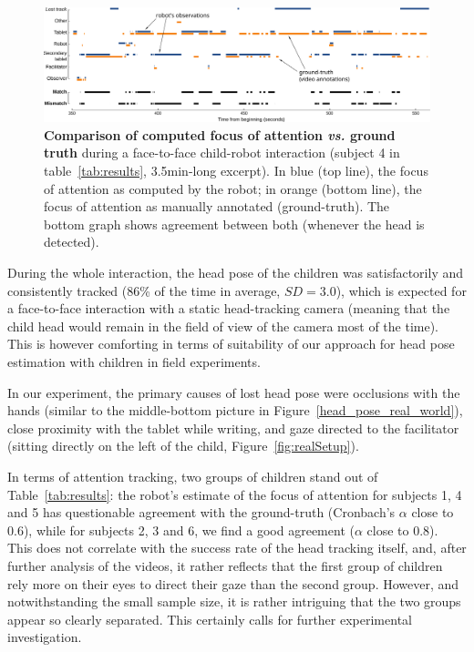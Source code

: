 \documentclass{sig-alternate}
\newcommand{\vs}{\textit{vs.}\xspace}
\begin{document}
\begin{figure}
    \centering
    \includegraphics[width=\linewidth]{matches-excerpt}
    \caption{\small \textbf{Comparison of computed focus of attention \vs ground
        truth} during a face-to-face child-robot interaction (subject 4
        in table~\ref{tab:results}, 3.5min-long excerpt).
        In blue (top line), the focus of attention as computed by the robot;
        in orange (bottom line), the focus of attention as manually annotated
        (ground-truth). The bottom graph shows agreement between both (whenever
        the head is detected).}

    \label{fig:realExpected}
    
\end{figure}


During the whole interaction, the head pose of the children was satisfactorily
and consistently tracked (86\% of the time in average, $SD=3.0$), which is
expected for a face-to-face interaction with a static head-tracking camera
(meaning that the child head would remain in the field of view of the camera
most of the time). This is however comforting in terms of suitability of our
approach for head pose estimation with children in field experiments.

In our experiment, the primary causes of lost head pose were occlusions with the
hands (similar to the middle-bottom picture in
Figure~\ref{head_pose_real_world}), close proximity with the tablet while
writing, and gaze directed to the facilitator (sitting directly on the left of
the child, Figure~\ref{fig:realSetup}).

In terms of attention tracking, two groups of children stand out of
Table~\ref{tab:results}: the robot's estimate of the focus of attention for
subjects 1, 4 and 5 has questionable agreement with the ground-truth (Cronbach's
$\alpha$ close to 0.6), while for subjects 2, 3 and 6, we find a good agreement
($\alpha$ close to 0.8). This does not correlate with the success rate of the
head tracking itself, and, after further analysis of the videos, it rather
reflects that the first group of children rely more on their eyes to direct
their gaze than the second group. However, and notwithstanding the small sample
size, it is rather intriguing that the two groups appear so clearly separated.
This certainly calls for further experimental investigation.
\end{document}
